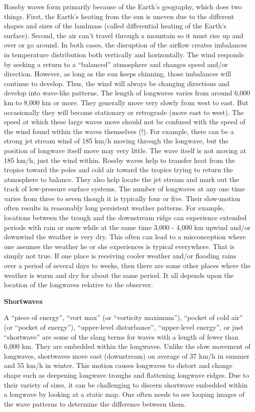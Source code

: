 \documentclass[12pt,oneside]{book}
\begin{document}
Rossby waves form primarily because of the Earth's geography, which does
two things. First, the Earth's heating from the sun is uneven due to the
different shapes and sizes of the landmass (called differential heating
of the Earth's surface). Second, the air can't travel through a mountain
so it must rise up and over or go around. In both cases, the disruption
of the airflow creates imbalances in temperature distribution both
vertically and horizontally. The wind responds by seeking a return to a
``balanced'' atmosphere and changes speed and/or direction. However, as
long as the sun keeps shinning, those imbalances will continue to
develop. Thus, the wind will always be changing directions and develop
into wave-like patterns. The length of longwaves varies from around
6,000 km to 8,000 km or more. They generally move very slowly from west
to east. But occasionally they will become stationary or retrograde
(move east to west). The speed at which these large waves move should
not be confused with the speed of the wind found within the waves
themselves (!). For example, there can be a strong jet stream wind of
185 km/h moving through the longwave, but the position of longwave
itself move may very little. The wave itself is not moving at 185 km/h,
just the wind within. Rossby waves help to transfer heat from the
tropics toward the poles and cold air toward the tropics trying to
return the atmosphere to balance. They also help locate the jet stream
and mark out the track of low-pressure surface systems. The number of
longwaves at any one time varies from three to seven though it is
typically four or five. Their slow-motion often results in reasonably
long persistent weather patterns. For example, locations between the
trough and the downstream ridge can experience extended periods with
rain or snow while at the same time 3,000 - 4,000 km upwind and/or
downwind the weather is very dry. This often can lead to a misconception
where one assumes the weather he or she experiences is typical
everywhere. That is simply not true. If one place is receiving cooler
weather and/or flooding rains over a period of several days to weeks,
then there are some other places where the weather is warm and dry for
about the same period. It all depends upon the location of the longwaves
relative to the observer.

\textbf{Shortwaves}

A ``piece of energy'', ``vort max'' (or ``vorticity maximum''), ``pocket
of cold air'' (or ``pocket of energy''), ``upper-level disturbance'',
``upper-level energy'', or just ``shortwave'' are some of the slang
terms for waves with a length of fewer than 6,000 km. They are embedded
within the longwaves. Unlike the slow movement of longwaves, shortwaves
move east (downstream) on average of 37 km/h in summer and 55 km/h in
winter. This motion causes longwaves to distort and change shape such as
deepening longwave troughs and flattening longwave ridges. Due to their
variety of sizes, it can be challenging to discern shortwave embedded
within a longwave by looking at a static map. One often needs to see
looping images of the wave patterns to determine the difference between
them.
\end{document}
